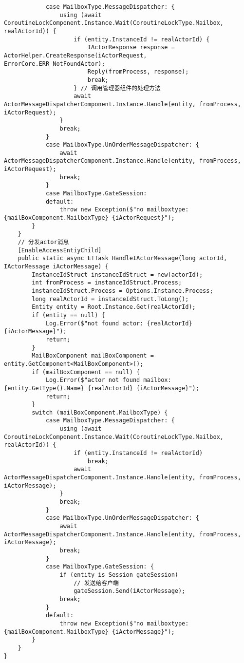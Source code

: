 \documentclass[9pt, b5paper]{article}
\begin{document}
\begin{verbatim}
            case MailboxType.MessageDispatcher: {
                using (await CoroutineLockComponent.Instance.Wait(CoroutineLockType.Mailbox, realActorId)) {
                    if (entity.InstanceId != realActorId) {
                        IActorResponse response = ActorHelper.CreateResponse(iActorRequest, ErrorCore.ERR_NotFoundActor);
                        Reply(fromProcess, response);
                        break;
                    } // 调用管理器组件的处理方法 
                    await ActorMessageDispatcherComponent.Instance.Handle(entity, fromProcess, iActorRequest);
                }
                break;
            }
            case MailboxType.UnOrderMessageDispatcher: {
                await ActorMessageDispatcherComponent.Instance.Handle(entity, fromProcess, iActorRequest);
                break;
            }
            case MailboxType.GateSession:
            default:
                throw new Exception($"no mailboxtype: {mailBoxComponent.MailboxType} {iActorRequest}");
        }
    }
    // 分发actor消息
    [EnableAccessEntiyChild]
    public static async ETTask HandleIActorMessage(long actorId, IActorMessage iActorMessage) {
        InstanceIdStruct instanceIdStruct = new(actorId);
        int fromProcess = instanceIdStruct.Process;
        instanceIdStruct.Process = Options.Instance.Process;
        long realActorId = instanceIdStruct.ToLong();
        Entity entity = Root.Instance.Get(realActorId);
        if (entity == null) {
            Log.Error($"not found actor: {realActorId} {iActorMessage}");
            return;
        }
        MailBoxComponent mailBoxComponent = entity.GetComponent<MailBoxComponent>();
        if (mailBoxComponent == null) {
            Log.Error($"actor not found mailbox: {entity.GetType().Name} {realActorId} {iActorMessage}");
            return;
        }
        switch (mailBoxComponent.MailboxType) {
            case MailboxType.MessageDispatcher: {
                using (await CoroutineLockComponent.Instance.Wait(CoroutineLockType.Mailbox, realActorId)) {
                    if (entity.InstanceId != realActorId) 
                        break;
                    await ActorMessageDispatcherComponent.Instance.Handle(entity, fromProcess, iActorMessage);
                }
                break;
            }
            case MailboxType.UnOrderMessageDispatcher: {
                await ActorMessageDispatcherComponent.Instance.Handle(entity, fromProcess, iActorMessage);
                break;
            }
            case MailboxType.GateSession: {
                if (entity is Session gateSession) 
                    // 发送给客户端
                    gateSession.Send(iActorMessage);
                break;
            }
            default:
                throw new Exception($"no mailboxtype: {mailBoxComponent.MailboxType} {iActorMessage}");
        }
    }
}
\end{verbatim}
\end{document}
